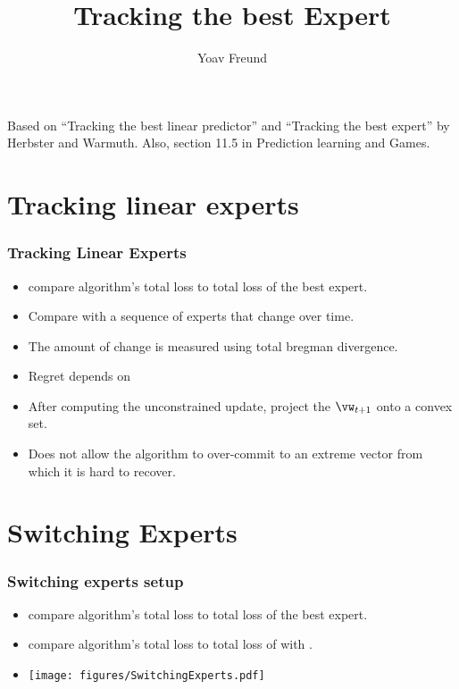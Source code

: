 \documentclass[handout]{beamer}
\title %
{Tracking the best Expert}
\author[Freund] %
{Yoav Freund}
\institute[Universities of Somewhere and Elsewhere] %
\begin{document}
%


\begin{frame}
  \titlepage
  Based on ``Tracking the best linear predictor'' and ``Tracking the
  best expert'' by Herbster and Warmuth. Also, section 11.5 in
  Prediction learning and Games.
\end{frame}

\section{Tracking linear experts}
\begin{frame}
\frametitle{Tracking Linear Experts }
\begin{itemize}
\item {} compare algorithm's total loss to total
  loss of the best expert.
\item {} Compare with a sequence of experts that
  change over time.
\item The amount of change is measured using total bregman
  divergence.
\item Regret depends on 
\item {} After computing the unconstrained
  update, project the $\vw_{t+1}$ onto a convex set.
\item Does not allow the algorithm to over-commit to an extreme vector
  from which it is hard to recover.
\end{itemize}
\end{frame}


\section{Switching Experts}

\begin{frame}
\frametitle{Switching experts setup}
\begin{itemize}
\item {} compare algorithm's total loss to total
  loss of the best expert.
\item {} compare algorithm's total loss to total
  loss of  with  .
\item
\texttt{[image: figures/SwitchingExperts.pdf]}
\end{itemize}
\end{frame}
\end{document}
